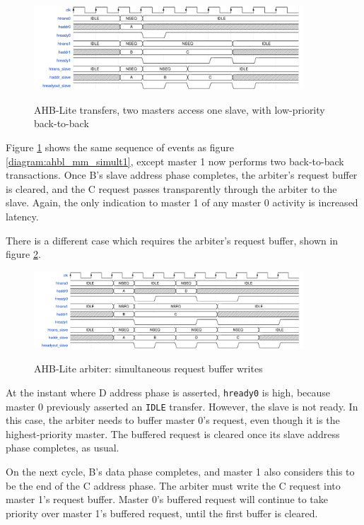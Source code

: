 \documentclass[notitlepage]{article}
\begin{document}
\begin{figure}[H]
\centering
\caption{AHB-Lite transfers, two masters access one slave, with low-priority back-to-back}
\includegraphics[width=0.9\textwidth]{waves/ahbl_mm_simult2.pdf}
\label{diagram:ahbl_mm_simult2}
\end{figure}

Figure \ref{diagram:ahbl_mm_simult2} shows the same sequence of events as figure \ref{diagram:ahbl_mm_simult1}, except master 1 now performs two back-to-back transactions. Once B's slave address phase completes, the arbiter's request buffer is cleared, and the C request passes transparently through the arbiter to the slave. Again, the only indication to master 1 of any master 0 activity is increased latency.

There is a different case which requires the arbiter's request buffer, shown in figure \ref{diagram:ahbl_mm_simult3}.

\begin{figure}[H]
\centering
\caption{AHB-Lite arbiter: simultaneous request buffer writes}
\includegraphics[width=0.9\textwidth]{waves/ahbl_mm_simult3.pdf}
\label{diagram:ahbl_mm_simult3}
\end{figure}

At the instant where D address phase is asserted, {\tt hready0} is high, because master 0 previously asserted an {\tt IDLE} transfer. However, the slave is not ready. In this case, the arbiter needs to buffer master 0's request, even though it is the highest-priority master. The buffered request is cleared once its slave address phase completes, as usual.

On the next cycle, B's data phase completes, and master 1 also considers this to be the end of the C address phase. The arbiter must write the C request into master 1's request buffer. Master 0's buffered request will continue to take priority over master 1's buffered request, until the first buffer is cleared.
\end{document}
